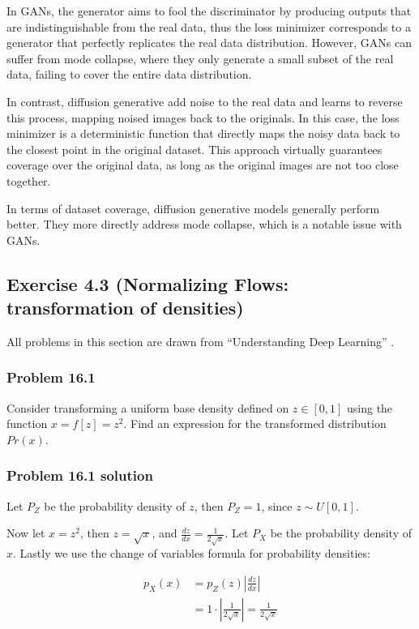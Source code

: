 \documentclass[
10pt, %
a4paper, %
oneside, %
headinclude,footinclude, %
BCOR5mm, %
]{scrartcl}
\begin{document}
In GANs, the generator aims to fool the discriminator by producing outputs that are indistinguishable from the real data, thus the loss minimizer corresponds to a generator that perfectly replicates the real data distribution. However, GANs can suffer from mode collapse, where they only generate a small subset of the real data, failing to cover the entire data distribution.

In contrast, diffusion generative add noise to the real data and learns to reverse this process, mapping noised images back to the originals. In this case, the loss minimizer is a deterministic function that directly maps the noisy data back to the closest point in the original dataset. This approach virtually guarantees coverage over the original data, as long as the original images are not too close together.

In terms of dataset coverage, diffusion generative models generally perform better. They more directly address mode collapse, which is a notable issue with GANs.

\newpage

\subsection*{Exercise 4.3 (Normalizing Flows: transformation of densities)}

All problems in this section are drawn from ``Understanding Deep Learning'' \citet{prince2023understanding}.

\subsubsection*{Problem 16.1}

Consider transforming a uniform base density defined on $z\in[0,1]$ using the function $x = f[z] = z^2$. Find an expression for the transformed distribution $Pr(x)$.

\subsubsection*{Problem 16.1 solution}

Let $P_Z$ be the probability density of $z$, then $P_Z = 1$, since $z\sim U[0,1]$.

Now let $x = z^2$, then $z = \sqrt{x}$, and $\frac{dz}{dx} = \frac{1}{2\sqrt{x}}$. Let $P_X$ be the probability density of $x$. Lastly we use the change of variables formula for probability densities:

\begin{align*}
  p_X(x) &= p_Z(z) \left|\frac{dz}{dx}\right| \\
  &= 1 \cdot \left| \frac{1}{2 \sqrt{x}} \right| = \frac{1}{2\sqrt{x}}
\end{align*}
\end{document}
